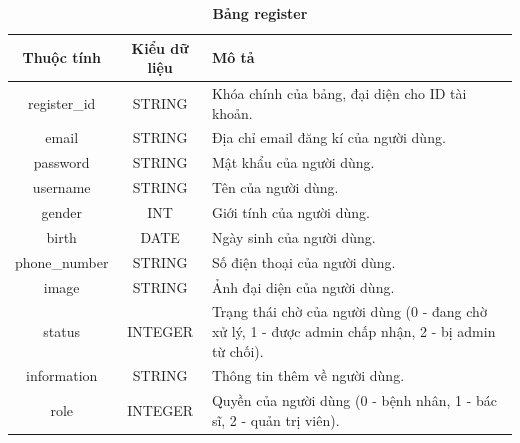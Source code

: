 \begin{table}[H]
  \caption{\bfseries \fontsize{12pt}{0pt}\selectfont Bảng register}
  \centering
  \begin{tabularx}{0.9\textwidth}{|c|c|X|}
    \hline
    \textbf{Thuộc tính} & \textbf{Kiểu dữ liệu} & \textbf{Mô tả} \\
    \hline
    register\_id & STRING & Khóa chính của bảng, đại diện cho ID tài khoản. \\
    \hline
    email & STRING & Địa chỉ email đăng kí của người dùng. \\
    \hline
    password & STRING & Mật khẩu của người dùng. \\
    \hline
    username & STRING & Tên của người dùng. \\
    \hline
    gender & INT & Giới tính của người dùng. \\
    \hline
    birth & DATE & Ngày sinh của người dùng. \\
    \hline
    phone\_number & STRING & Số điện thoại của người dùng. \\
    \hline
    image & STRING & Ảnh đại diện của người dùng. \\
    \hline
    status & INTEGER & Trạng thái chờ của người dùng (0 - đang chờ xử lý, 1 - được admin chấp nhận, 2 - bị admin từ chối). \\
    \hline
    information & STRING & Thông tin thêm về người dùng. \\
    \hline
    role & INTEGER & Quyền của người dùng (0 - bệnh nhân, 1 - bác sĩ, 2 - quản trị viên).\\
    \hline
  \end{tabularx}
\end{table}

